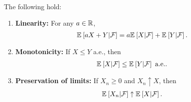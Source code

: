 \begin{prop}
    The following hold:
    \begin{enumerate}
        \item {\bf Linearity:} For any $a \in \mathbb{R}$,
        \begin{align*}
            {\mathbb E}_{}\left[aX + Y | \mathcal{F}\right] = a{\mathbb E}_{}\left[X | \mathcal{F}\right] + {\mathbb E}_{}\left[Y | \mathcal{F}\right].
        \end{align*}
        \item {\bf Monotonicity:} If $X \leq Y$ a.e., then 
        \begin{align*}
            {\mathbb E}_{}\left[X | \mathcal{F}\right] \leq {\mathbb E}_{}\left[Y | \mathcal{F}\right] \text{ a.e.}.
        \end{align*}
        \item {\bf Preservation of limits:} If $X_n \geq 0$ and $X_n \uparrow X$, then
        \begin{align*}
            {\mathbb E}_{}\left[X_n | \mathcal{F}\right] \uparrow {\mathbb E}_{}\left[X | \mathcal{F}\right].
        \end{align*}
    \end{enumerate}
\end{prop}
